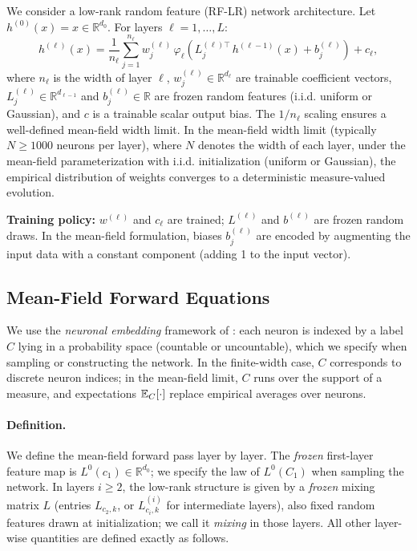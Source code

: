 \documentclass[nohyperref]{article}
\theoremstyle{plain}
\theoremstyle{definition}
\theoremstyle{remark}
\begin{document}
We consider a low-rank random feature (RF-LR) network architecture. Let $h^{(0)}(x) = x \in \mathbb{R}^{d_0}$. For layers $\ell = 1, \ldots, L$:
\begin{equation}
\label{eq:RF-LR}
h^{(\ell)}(x) = \frac{1}{n_\ell} \sum_{j=1}^{n_\ell} w^{(\ell)}_j\,\varphi_\ell\!\left(L^{(\ell)\top}_j\,h^{(\ell-1)}(x) + b^{(\ell)}_j\right) + c_{\ell},
\end{equation}
where $n_\ell$ is the width of layer $\ell$, $w^{(\ell)}_j \in \mathbb{R}^{d_\ell}$ are trainable coefficient vectors, $L^{(\ell)}_j \in \mathbb{R}^{d_{\ell-1}}$ and $b^{(\ell)}_j \in \mathbb{R}$ are frozen random features (i.i.d. uniform or Gaussian), and $c$ is a trainable scalar output bias. The $1/n_\ell$ scaling ensures a well-defined mean-field width limit. In the mean-field width limit (typically $N \ge 1000$ neurons per layer), where $N$ denotes the width of each layer, under the mean-field parameterization with i.i.d. initialization (uniform or Gaussian), the empirical distribution of weights converges to a deterministic measure-valued evolution.

\textbf{Training policy:} $w^{(\ell)}$ and $c_{\ell}$ are trained; $L^{(\ell)}$ and $b^{(\ell)}$ are frozen random draws. In the mean-field formulation, biases $b^{(\ell)}_j$ are encoded by augmenting the input data with a constant component (adding 1 to the input vector).

\subsection{Mean-Field Forward Equations}
\label{subsec:forward-equations}

We use the \emph{neuronal embedding} framework of \cite{nguyen2023rigorousframeworkmeanfield}: each neuron is indexed by a label $C$ lying in a probability space (countable or uncountable), which we specify when sampling or constructing the network. In the finite-width case, $C$ corresponds to discrete neuron indices; in the mean-field limit, $C$ runs over the support of a measure, and expectations $\mathbb{E}_C[\cdot]$ replace empirical averages over neurons.

\paragraph{Definition.}
We define the mean-field forward pass layer by layer. The \emph{frozen} first-layer feature map is $L^0(c_1) \in \mathbb{R}^{d_0}$; we specify the law of $L^0(C_1)$ when sampling the network. In layers $i \ge 2$, the low-rank structure is given by a \emph{frozen} mixing matrix $L$ (entries $L_{c_2,k}$, or $L^{(i)}_{c_i,k}$ for intermediate layers), also fixed random features drawn at initialization; we call it \emph{mixing} in those layers. All other layer-wise quantities are defined exactly as follows.
\end{document}
